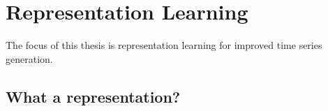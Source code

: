 \documentclass[../../thesis.tex]{subfiles}
\begin{document}














\section{Representation Learning}

The focus of this thesis is representation learning for improved time series generation.

\subsection{What a representation?}
\end{document}
